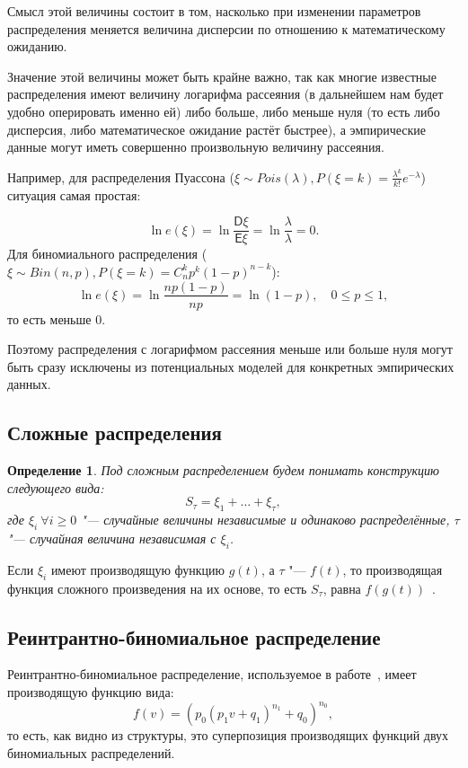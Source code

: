 \documentclass[12pt, specialist, subf, substylefile = spbu_report.rtx]{disser}
\newtheorem{define}{Определение}
\begin{document}
	Смысл этой величины состоит в том, насколько при изменении параметров распределения меняется величина дисперсии по отношению к математическому ожиданию.
	
	Значение этой величины может быть крайне важно, так как многие известные распределения имеют величину логарифма рассеяния (в дальнейшем нам будет удобно оперировать именно ей) либо больше, либо меньше нуля (то есть либо дисперсия, либо математическое ожидание растёт быстрее), а эмпирические данные могут иметь совершенно произвольную величину рассеяния.
	
	Например, для распределения Пуассона ($ \xi \sim Pois(\lambda), P (\xi = k) = \frac {\lambda ^ k} {k !} e ^{-\lambda} $) ситуация самая простая:
	
	\[
		\ln e (\xi) = \ln \frac {\mathsf{D} \xi} {\mathsf{E} \xi} = \ln \frac \lambda \lambda = 0.
	\]
	Для биномиального распределения ($ \xi \sim Bin(n, p), P (\xi = k) = C ^k _n p ^k (1 - p) ^{n - k} $):
	\[
		\ln e (\xi) = \ln \frac {n p (1 - p)} {np} = \ln (1 - p), \quad 0 \leqslant p \leqslant 1,
	\]
	то есть меньше $ 0 $.
	
	Поэтому распределения с логарифмом рассеяния меньше или больше нуля могут быть сразу исключены из потенциальных моделей для конкретных эмпирических данных.
	
	\subsection{Сложные распределения}
	
	\begin{define}
		Под сложным распределением будем понимать конструкцию следующего вида:
		\[
			S _\tau = \xi _1 + \dots + \xi _\tau,
		\]
		где $\xi _i~ \forall i \geqslant 0$ "--- случайные величины независимые и одинаково распределённые, $\tau$ "--- случайная величина независимая с $\xi _i$.
		\label{def:harddistr}
	\end{define}

	Если $\xi _i$ имеют производящую функцию $g(t)$, а $\tau$ "---  $f(t)$, то производящая функция сложного произведения на их основе, то есть $S _\tau$, равна $f(g(t))$~\cite{bib:feller1952}.
	
	\subsection{Реинтрантно-биномиальное распределение}
	
	Реинтрантно-биномиальное распределение, используемое в работе~\cite{bib:alexeeva2008}, имеет производящую функцию вида:
	\[
		f(v) = (p _0(p _1 v + q _1) ^{n _1} + q _0) ^{n _0},
	\]
	то есть, как видно из структуры, это суперпозиция производящих функций двух биномиальных распределений.
	
\end{document}
